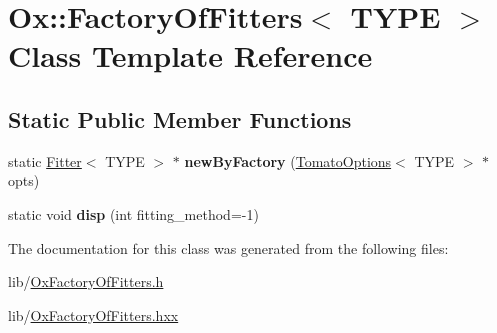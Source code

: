 \hypertarget{class_ox_1_1_factory_of_fitters}{\section{Ox\-:\-:Factory\-Of\-Fitters$<$ T\-Y\-P\-E $>$ Class Template Reference}
\label{class_ox_1_1_factory_of_fitters}
}
\subsection*{Static Public Member Functions}
\begin{DoxyCompactItemize}
\item 
\hypertarget{class_ox_1_1_factory_of_fitters_ab06c65d6b109d8f408140caa4d25b30c}{static \hyperlink{class_ox_1_1_fitter}{Fitter}$<$ T\-Y\-P\-E $>$ $\ast$ {\bfseries new\-By\-Factory} (\hyperlink{struct_ox_1_1_tomato_options}{Tomato\-Options}$<$ T\-Y\-P\-E $>$ $\ast$opts)}\label{class_ox_1_1_factory_of_fitters_ab06c65d6b109d8f408140caa4d25b30c}

\item 
\hypertarget{class_ox_1_1_factory_of_fitters_ac7272c8c931efaa1ea7b9f78c61f261a}{static void {\bfseries disp} (int fitting\-\_\-method=-\/1)}\label{class_ox_1_1_factory_of_fitters_ac7272c8c931efaa1ea7b9f78c61f261a}

\end{DoxyCompactItemize}


The documentation for this class was generated from the following files\-:\begin{DoxyCompactItemize}
\item 
lib/\hyperlink{_ox_factory_of_fitters_8h}{Ox\-Factory\-Of\-Fitters.\-h}\item 
lib/\hyperlink{_ox_factory_of_fitters_8hxx}{Ox\-Factory\-Of\-Fitters.\-hxx}\end{DoxyCompactItemize}
